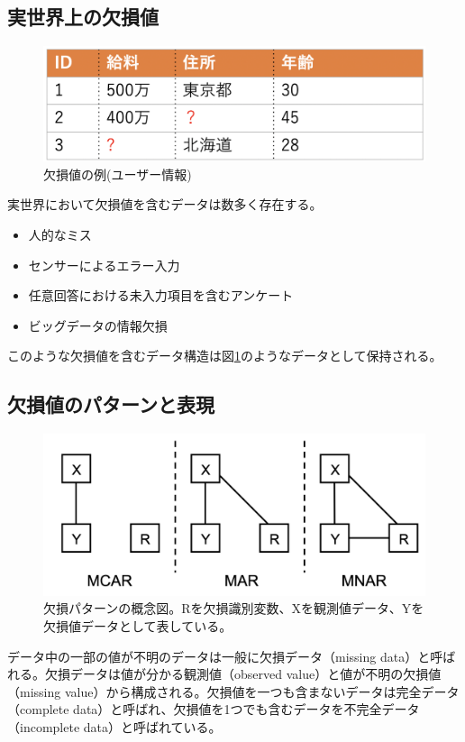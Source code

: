 \subsection{実世界上の欠損値}
\begin{figure}[tb]
  \centering
  \includegraphics[width=0.5\hsize]{figures/missing_example.png}
  \caption{欠損値の例(ユーザー情報)}
  \label{fig:missing_example}
\end{figure}
実世界において欠損値を含むデータは数多く存在する。
\begin{itemize}
	\item 人的なミス
	\item センサーによるエラー入力
	\item 任意回答における未入力項目を含むアンケート
    \item ビッグデータの情報欠損
\end{itemize}
このような欠損値を含むデータ構造は図\ref{fig:missing_example}のようなデータとして保持される。

\subsection{欠損値のパターンと表現}
\begin{figure}[tb]
  \centering
  \includegraphics[width=\hsize]{figures/missing_pattern.png}
  \caption{欠損パターンの概念図。Rを欠損識別変数、Xを観測値データ、Yを欠損値データとして表している。}
  \label{fig:missing_pattern}
\end{figure}
データ中の一部の値が不明のデータは一般に欠損データ（missing data）と呼ばれる。欠損データは値が分かる観測値（observed value）と値が不明の欠損値（missing value）から構成される。欠損値を一つも含まないデータは完全データ（complete data）と呼ばれ、欠損値を1つでも含むデータを不完全データ（incomplete data）と呼ばれている。

